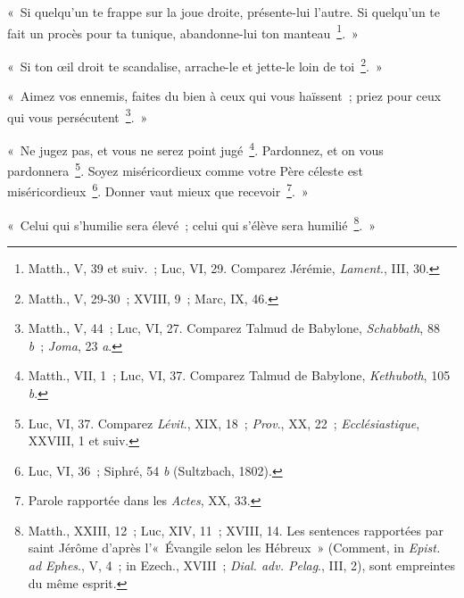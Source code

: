 \documentclass[french,twoside]{book} %
\newenvironment{quoteblock}%
  {\begin{quoting}}
  {\end{quoting}}
\newenvironment{quotebar}{%
    \def\FrameCommand{{\color{rubric!10!}\vrule width 0.5em} \hspace{0.9em}}%
    \def\OuterFrameSep{\itemsep} %
    \MakeFramed {\advance\hsize-\width \FrameRestore}
  }%
  {%
    \endMakeFramed
  }
\renewenvironment{quoteblock}%
  {%
    \savenotes
    \setstretch{0.9}
    \normalfont
    \begin{quotebar}
  }
  {%
    \end{quotebar}
    \spewnotes
  }
\begin{document}
\begin{quoteblock}
 \noindent « Si quelqu’un te frappe sur la joue droite, présente-lui l’autre. Si quelqu’un te fait un procès pour ta tunique, abandonne-lui ton manteau \footnote{ Matth., V, 39 et suiv. ; Luc, VI, 29. Comparez Jérémie, {\itshape Lament}., III, 30.}. »\par
 « Si ton œil droit te scandalise, arrache-le et jette-le loin de toi \footnote{Matth., V, 29-30 ; XVIII, 9 ; Marc, IX, 46.}. »\par
 « Aimez vos ennemis, faites du bien à ceux qui vous haïssent ; priez pour ceux qui vous persécutent \footnote{ Matth., V, 44 ; Luc, VI, 27. Comparez Talmud de Babylone, {\itshape Schabbath}, 88 {\itshape b} ; {\itshape Joma}, 23 {\itshape a}.}. »\par
 « Ne jugez pas, et vous ne serez point jugé \footnote{ Matth., VII, 1 ; Luc, VI, 37. Comparez Talmud de Babylone, {\itshape Kethuboth}, 105 {\itshape b}.}. Pardonnez, et on vous pardonnera \footnote{ Luc, VI, 37. Comparez {\itshape Lévit}., XIX, 18 ; {\itshape Prov}., XX, 22 ; {\itshape Ecclésiastique}, XXVIII, 1 et suiv.}. Soyez miséricordieux comme votre Père céleste est miséricordieux \footnote{ Luc, VI, 36 ; Siphré, 54 {\itshape b} (Sultzbach, 1802).}. Donner vaut mieux que recevoir \footnote{ Parole rapportée dans les {\itshape Actes}, XX, 33.}. »\par
 « Celui qui s’humilie sera élevé ; celui qui s’élève sera humilié \footnote{ Matth., XXIII, 12 ; Luc, XIV, 11 ; XVIII, 14. Les sentences rapportées par saint Jérôme d’après l’« Évangile selon les Hébreux » (Comment, in {\itshape Epist. ad Ephes}., V, 4 ; in Ezech., XVIII ; {\itshape Dial. adv. Pelag}., III, 2), sont empreintes du même esprit.}. »
 \end{quoteblock}
\end{document}
